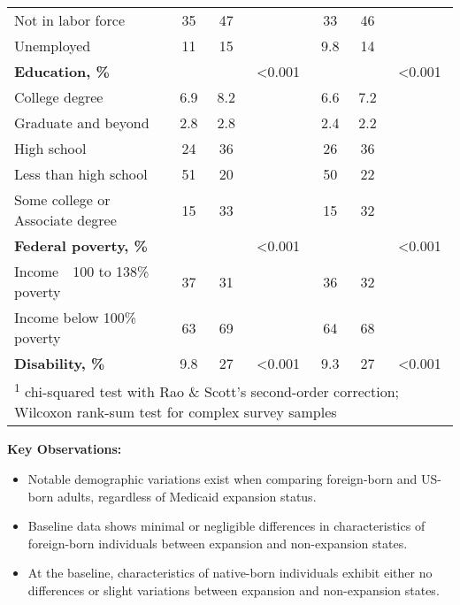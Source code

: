\documentclass[
]{article}
\providecommand{\tightlist}{%
  \setlength{\itemsep}{0pt}\setlength{\parskip}{0pt}}
\let\origtable\table
\let\endorigtable\endtable
\renewenvironment{table}[1][ht]{
      \expandafter\origtable\expandafter[H]
    }{
      \endorigtable
    }
\begin{document}
\begin{table}[H]
{\begin{tabular}[t]{lcccccc}
\hspace{1em}Not in labor force & 35 & 47 &  & 33 & 46 & \\
\hspace{1em}Unemployed & 11 & 15 &  & 9.8 & 14 & \\
\textbf{Education, \%} &  &  & <0.001 &  &  & <0.001\\
\hspace{1em}College degree & 6.9 & 8.2 &  & 6.6 & 7.2 & \\
\hspace{1em}Graduate and beyond & 2.8 & 2.8 &  & 2.4 & 2.2 & \\
\hspace{1em}High school & 24 & 36 &  & 26 & 36 & \\
\hspace{1em}Less than high school & 51 & 20 &  & 50 & 22 & \\
\hspace{1em}Some college or Associate degree & 15 & 33 &  & 15 & 32 & \\
\textbf{Federal poverty, \%} &  &  & <0.001 &  &  & <0.001\\
\hspace{1em}Income\ \ 100 to 138\% poverty & 37 & 31 &  & 36 & 32 & \\
\hspace{1em}Income below 100\% poverty & 63 & 69 &  & 64 & 68 & \\
\textbf{Disability, \%} & 9.8 & 27 & <0.001 & 9.3 & 27 & <0.001\\
\bottomrule
\multicolumn{7}{l}{\rule{0pt}{1em}\textsuperscript{1} chi-squared test with Rao \& Scott's second-order correction; Wilcoxon rank-sum test for complex survey samples}\\
\end{tabular}}
\end{table}

\textbf{Key Observations:}

\begin{itemize}
\tightlist
\item
  Notable demographic variations exist when comparing foreign-born and
  US-born adults, regardless of Medicaid expansion status.
\item
  Baseline data shows minimal or negligible differences in
  characteristics of foreign-born individuals between expansion and
  non-expansion states.
\item
  At the baseline, characteristics of native-born individuals exhibit
  either no differences or slight variations between expansion and
  non-expansion states.
\end{itemize}
\end{document}
